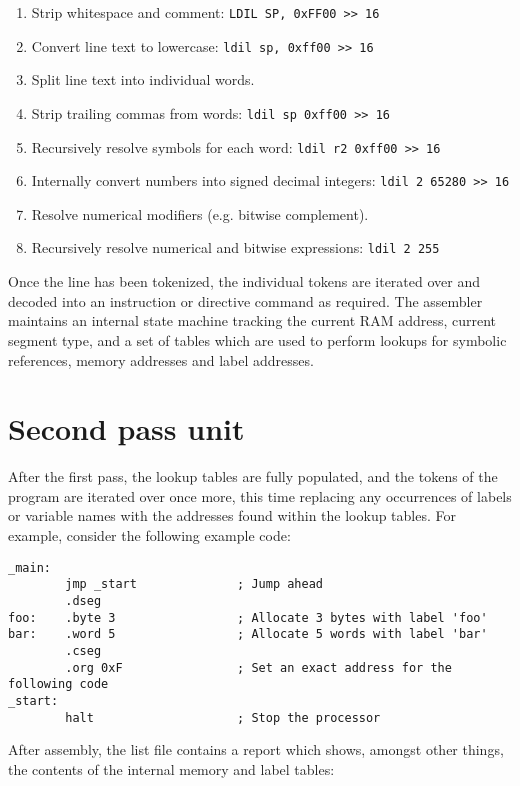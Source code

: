 \documentclass[12pt,twoside]{report}
\begin{document}
\begin{enumerate}
\item Strip whitespace and comment: \texttt{LDIL SP, 0xFF00 >> 16}
\item Convert line text to lowercase: \texttt{ldil sp, 0xff00 >> 16}
\item Split line text into individual words.
\item Strip trailing commas from words: \texttt{ldil sp 0xff00 >> 16}
\item Recursively resolve symbols for each word: \texttt{ldil r2 0xff00 >> 16}
\item Internally convert numbers into signed decimal integers: \texttt{ldil 2 65280 >> 16}
\item Resolve numerical modifiers (e.g. bitwise complement).
\item Recursively resolve numerical and bitwise expressions: \texttt{ldil 2 255}
\end{enumerate}

Once the line has been tokenized, the individual tokens are iterated
over and decoded into an instruction or directive command as
required. The assembler maintains an internal state machine tracking
the current RAM address, current segment type, and a set of tables
which are used to perform lookups for symbolic references, memory
addresses and label addresses.

\section{Second pass unit}

After the first pass, the lookup tables are fully populated, and the
tokens of the program are iterated over once more, this time replacing
any occurrences of labels or variable names with the addresses found
within the lookup tables. For example, consider the following example
code:

\begin{verbatim}
_main:
        jmp _start              ; Jump ahead
        .dseg
foo:    .byte 3                 ; Allocate 3 bytes with label 'foo'
bar:    .word 5                 ; Allocate 5 words with label 'bar'
        .cseg
        .org 0xF                ; Set an exact address for the following code
_start:
        halt                    ; Stop the processor
\end{verbatim}

After assembly, the list file contains a report which shows, amongst
other things, the contents of the internal memory and label tables:
\end{document}
